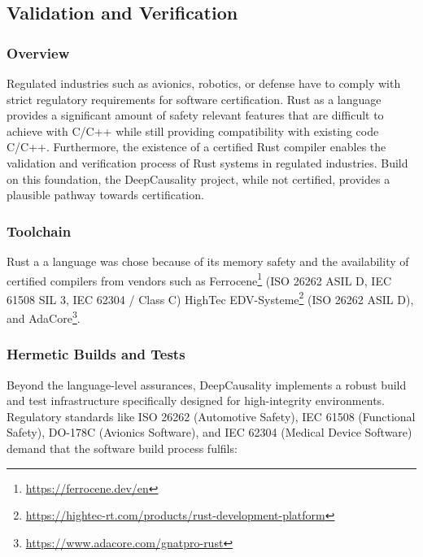 
\subsection{Validation and Verification}
\label{sec:implementation_validation}

\subsubsection{Overview}

Regulated industries such as avionics, robotics, or defense have to comply with strict regulatory requirements for software certification. Rust as a language provides a significant amount of safety relevant features that are difficult to achieve with C/C++ while still providing compatibility with existing code C/C++. Furthermore, the existence of a certified Rust compiler enables the validation and verification process of Rust systems in regulated industries. Build on this foundation, the DeepCausality project, while not certified, provides a plausible pathway towards certification. 

\subsubsection{Toolchain}

Rust a a language was chose because of its memory safety and the availability of certified compilers from vendors such
as Ferrocene\footnote{\url{https://ferrocene.dev/en}} (ISO 26262 ASIL D, IEC 61508 SIL 3, IEC 62304 / Class C) HighTec EDV-Systeme\footnote{\url{https://hightec-rt.com/products/rust-development-platform}} (ISO 26262 ASIL D), and AdaCore\footnote{\url{https://www.adacore.com/gnatpro-rust}}. 

\subsubsection{Hermetic Builds and Tests}

Beyond the language-level assurances, DeepCausality implements a robust build and test infrastructure specifically designed for high-integrity environments. Regulatory standards like ISO 26262 (Automotive Safety), IEC 61508 (Functional Safety), DO-178C (Avionics Software), and IEC 62304 (Medical Device Software) demand that the software build process fulfils:

